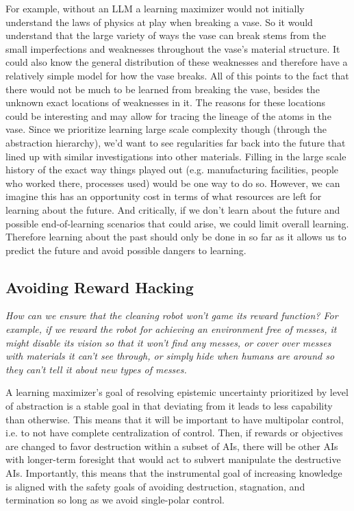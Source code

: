 \documentclass{article}
\begin{document}
For example, without an LLM a learning maximizer would not initially understand the laws of physics at play when breaking a vase. So it would understand that the large variety of ways the vase can break stems from the small imperfections and weaknesses throughout the vase's material structure. It could also know the general distribution of these weaknesses and therefore have a relatively simple model for how the vase breaks. All of this points to the fact that there would not be much to be learned from breaking the vase, besides the unknown exact locations of weaknesses in it. The reasons for these locations could be interesting and may allow for tracing the lineage of the atoms in the vase. Since we prioritize learning large scale complexity though (through the abstraction hierarchy), we'd want to see regularities far back into the future that lined up with similar investigations into other materials. Filling in the large scale history of the exact way things played out (e.g. manufacturing facilities, people who worked there, processes used) would be one way to do so. However, we can imagine this has an opportunity cost in terms of what resources are left for learning about the future. And critically, if we don't learn about the future and possible end-of-learning scenarios that could arise, we could limit overall learning. Therefore learning about the past should only be done in so far as it allows us to predict the future and avoid possible dangers to learning.

\subsection{Avoiding Reward Hacking}

\textit{How can we ensure that the cleaning robot won’t game its
reward function? For example, if we reward the robot for achieving an environment free of messes, it might disable its vision so that it won’t find any messes, or cover over messes with materials it can’t see through, or simply hide when humans are around so they can’t tell it about new types of messes.}

\hspace{1pt}

A learning maximizer's goal of resolving epistemic uncertainty prioritized by level of abstraction is a stable goal in that deviating from it leads to less capability than otherwise. This means that it will be important to have multipolar control, i.e. to not have complete centralization of control. Then, if rewards or objectives are changed to favor destruction within a subset of AIs, there will be other AIs with longer-term foresight that would act to subvert  manipulate the destructive AIs. Importantly, this means that the instrumental goal \cite{bostrom-instrumental} of increasing knowledge is aligned with the safety goals of avoiding destruction, stagnation, and termination so long as we avoid single-polar control.
\end{document}
